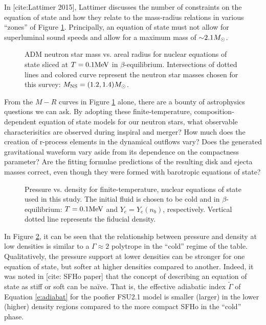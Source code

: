 In [cite:Lattimer 2015], Lattimer discusses the number of constraints on the equation of state and how they relate to the mass-radius relations in various ``zones'' of Figure \ref{fig:MvsR}.  Principally, an equation of state must not allow for superluminal sound speeds and allow for a maximum mass of $\mathord{\sim} 2.1 M_{\odot}$.

\begin{figure}
	\centering
	
	\caption[Neutron star mass vs. areal radius]{
		ADM neutron star mass vs. areal radius for nuclear equations of state sliced at $T=0.1{\rm MeV}$ in $\beta$-equilibrium.  Intersections of dotted lines and colored curve represent the neutron star masses chosen for this survey: $M_{\rm NS} = (1.2, 1.4) M_{\odot}$.  
	}
	\label{fig:MvsR}
\end{figure}

From the $M-R$ curves in Figure \ref{fig:MvsR} alone, there are a bounty of astrophysics questions we can ask.  
By adopting these finite-temperature, composition-dependent equation of state models for our neutron stars, what observable characterisitics are observed during inspiral and merger?  
How much does the creation of r-process elements in the dynamical outflows vary?  
Does the generated gravitational waveform vary aside from its dependence on the compactness parameter?  
Are the fitting formulae predictions of the resulting disk and ejecta masses correct, even though they were formed with barotropic equations of state?

\begin{figure}
	\centering
	
	\caption[Pressure vs. density for a cold, beta-equilibrium slice]{
		Pressure vs. density for finite-temperature, nuclear equations of state used in this study. The initial fluid is chosen to be cold and in $\beta$-equilibrium: $T=0.1 {\rm MeV}$ and $Y_e = Y_e (n_b)$, respectively.  Vertical dotted line represents the fiducial density.
	}
	\label{fig:PvsRho}
\end{figure}

In Figure \ref{fig:PvsRho}, it can be seen that the relationship between pressure and density at low densities is similar to a $\Gamma \approx 2$ polytrope in the ``cold'' regime of the table.  
Qualitatively, the pressure support at lower densities can be stronger for one equation of state, but softer at higher densities compared to another.  
Indeed, it was noted in [cite: SFHo paper] that the concept of describing an equation of state as stiff or soft can be na\"{i}ve.  That is, the effective adiabatic index $\tilde{\Gamma}$ of Equation \ref{e:adiabat} for the poofier FSU2.1 model is smaller (larger) in the lower (higher) density regions compared to the more compact SFHo in the ``cold'' phase.

